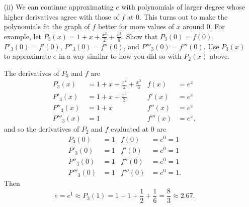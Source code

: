 \begin{pa}
\begin{itemize}
\begin{activitySolution}
\end{activitySolution}

    \item[(ii)] We can continue approximating $e$ with polynomials of larger degree whose higher derivatives agree with those of $f$ at 0. This turns out to make the polynomials fit the graph of $f$ better for more values of $x$ around 0. For example, let $P_3(x) = 1+x+\frac{x^2}{2}+\frac{x^3}{6}$. Show that $P_3(0) = f(0)$, $P'_3(0) = f'(0)$, $P''_3(0) = f''(0)$, and $P'''_3(0) = f'''(0)$. Use $P_3(x)$ to approximate $e$ in a way similar to how you did so with $P_2(x)$ above.

\begin{activitySolution}

The derivatives of $P_3$ and $f$ are
\begin{align*}
P_3(x) &= 1+x+\frac{x^2}{2}+\frac{x^3}{6} & f(x) &= e^x \\
P'_3(x) &= 1 + x +\frac{x^2}{2}  & f'(x) &= e^x \\
P''_3(x) &= 1+x  & f''(x) &= e^x \\
P'''_3(x) &= 1  & f'''(x) &= e^x,
\end{align*}
and so the derivatives of $P_2$ and $f$ evaluated at 0 are
\begin{align*}
P_3(0) &= 1 & f(0) &= e^0 = 1 \\
P'_3(0) &= 1 & f'(0) &= e^0 = 1 \\
P''_3(0) &= 1 & f''(0) &= e^0 = 1 \\
P'''_3(0) &= 1 & f'''(0) &= e^0 = 1.
\end{align*}
Then
\[e = e^1 \approx P_3(1) = 1 + 1 + \frac{1}{2} + \frac{1}{6} = \frac{8}{3} \approx 2.67.\]

\end{activitySolution}
        
    \end{itemize}
  \ea

\end{pa}
\afterpa 